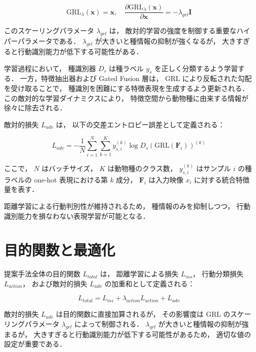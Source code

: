 \begin{equation}
  \text{GRL}_{\lambda}(\mathbf{x}) = \mathbf{x}, \quad
  \frac{\partial \text{GRL}_{\lambda}(\mathbf{x})}{\partial \mathbf{x}} = -\lambda_{grl} \mathbf{I}
  \label{eq:grl}
\end{equation}

このスケーリングパラメータ $\lambda_{grl}$ は，
敵対的学習の強度を制御する重要なハイパーパラメータである．
$\lambda_{grl}$ が大きいと種情報の抑制が強くなるが，
大きすぎると行動識別能力が低下する可能性がある．

学習過程において，
種識別器 $D_s$ は種ラベル $y_s$ を正しく分類するよう学習する．
一方，特徴抽出器および Gated Fusion 層は，
GRL により反転された勾配を受け取ることで，
種識別を困難にする特徴表現を生成するよう更新される．
この敵対的な学習ダイナミクスにより，
特徴空間から動物種に由来する情報が徐々に除去される．

敵対的損失 $L_{adv}$ は，
以下の交差エントロピー誤差として定義される：

\begin{equation}
  L_{adv}
  = -\frac{1}{N}
  \sum_{i=1}^{N}
  \sum_{k=1}^{K}
  y_{s,i}^{(k)}
  \log D_s(\text{GRL}(\mathbf{F}_i))^{(k)}
  \label{eq:adv_loss}
\end{equation}

ここで，
$N$ はバッチサイズ，
$K$ は動物種のクラス数，
$y_{s,i}^{(k)}$ はサンプル $i$ の種ラベルの one-hot 表現における第 $k$ 成分，
$\mathbf{F}_i$ は入力映像 $x_i$ に対する統合特徴量を表す．

距離学習による行動判別性が維持されるため，
種情報のみを抑制しつつ，
行動識別能力を損なわない表現学習が可能となる．

\section{目的関数と最適化}

提案手法全体の目的関数 $L_{total}$ は，
距離学習による損失 $L_{ms}$，
行動分類損失 $L_{action}$，
および敵対的損失 $L_{adv}$ の加重和として定義される：

\begin{equation}
  L_{total} = L_{ms} + \lambda_{action} L_{action} + L_{adv}
  \label{eq:total_loss}
\end{equation}

敵対的損失 $L_{adv}$ は目的関数に直接加算されるが，
その影響度は GRL のスケーリングパラメータ $\lambda_{grl}$ によって制御される．
$\lambda_{grl}$ が大きいと種情報の抑制が強まるが，
大きすぎると行動識別能力が低下する可能性があるため，
適切な値の設定が重要である．

